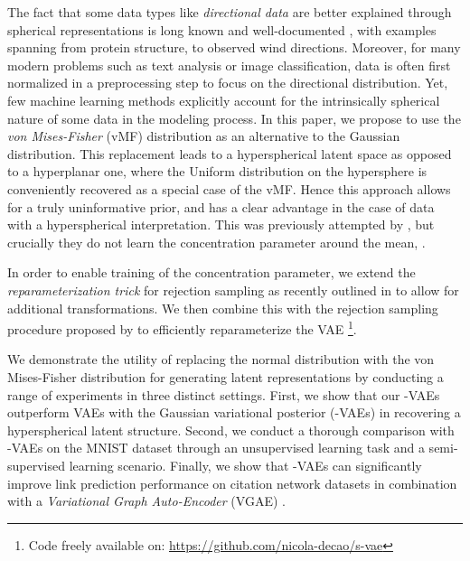 \documentclass[letterpaper]{article}
\newcommand{\Sv}{}
\newcommand{\Nv}{}
\begin{document}
The fact that some data types like \textit{directional data} are better explained through spherical representations is long known and well-documented \citep{mardia1975statistics, fisher1987statistical}, with examples spanning from protein structure, to observed wind directions. Moreover, for many modern problems such as text analysis or image classification, data is often first normalized in a preprocessing step to focus on the directional distribution. Yet, few machine learning methods explicitly account for the intrinsically spherical nature of some data in the modeling process. In this paper, we propose to use the \textit{von Mises-Fisher} (vMF) distribution as an alternative to the Gaussian distribution. This replacement leads to a hyperspherical latent space as opposed to a hyperplanar one, where the Uniform distribution on the hypersphere is conveniently recovered as a special case of the vMF. Hence this approach allows for a truly uninformative prior, and has a clear advantage in the case of data with a hyperspherical interpretation. This was previously attempted by \cite{hasnat2017mises}, but crucially they do not learn the concentration parameter around the mean, .

In order to enable training of the concentration parameter, we extend the \textit{reparameterization trick} for rejection sampling as recently outlined in \cite{rejection-repar} to allow for  additional transformations. We then combine this with the rejection sampling procedure proposed by \cite{sample-vmf} to efficiently reparameterize the VAE \footnote{Code freely  available on: \url{https://github.com/nicola-decao/s-vae}}.

We demonstrate the utility of replacing the normal distribution with the von Mises-Fisher distribution for generating latent representations by conducting a range of experiments in three distinct settings. First, we show that our \Sv-VAEs outperform VAEs with the Gaussian variational posterior (\Nv-VAEs) in recovering a hyperspherical latent structure. Second, we conduct a thorough comparison with \Nv-VAEs on the MNIST dataset through an unsupervised learning task and a semi-supervised learning scenario. Finally, we show that \Sv-VAEs can significantly improve link prediction performance on citation network datasets in combination with a \textit{Variational Graph Auto-Encoder} (VGAE) \citep{kipf2016VGAE}. 
\end{document}

